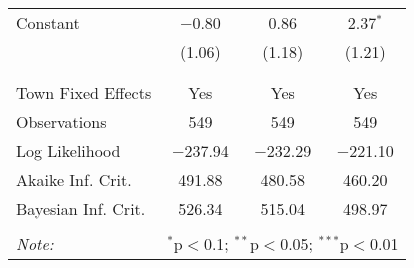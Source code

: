 \begin{table}[H]
\begin{tabular}{@{\extracolsep{5pt}}lccc}
 Constant & $-$0.80 & 0.86 & 2.37$^{*}$ \\ 
  & (1.06) & (1.18) & (1.21) \\ 
  & & & \\ 
\hline \\[-1.8ex] 
Town Fixed Effects & Yes & Yes & Yes \\ 
Observations & 549 & 549 & 549 \\ 
Log Likelihood & $-$237.94 & $-$232.29 & $-$221.10 \\ 
Akaike Inf. Crit. & 491.88 & 480.58 & 460.20 \\ 
Bayesian Inf. Crit. & 526.34 & 515.04 & 498.97 \\ 
\hline 
\hline \\[-1.8ex] 
\textit{Note:}  & \multicolumn{3}{r}{$^{*}$p$<$0.1; $^{**}$p$<$0.05; $^{***}$p$<$0.01} \\ 
\end{tabular} 
\end{table} 
